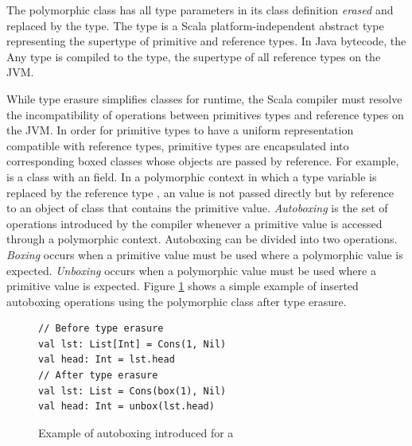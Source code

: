 The polymorphic  class has all type parameters in its class definition \textit{erased} and replaced by the  type.
The  type is a Scala platform-independent\cite{scala:overview} abstract type representing the supertype of primitive and reference types.
In Java bytecode, the {Any} type is compiled to the  type, the supertype of all reference types on the JVM.

While type erasure simplifies classes for runtime, the Scala compiler must resolve the incompatibility of operations between primitives types and reference types on the JVM\cite{java:vm-spec}.
In order for primitive types to have a uniform representation compatible with reference types, primitive types are encapsulated into corresponding boxed classes whose objects are passed by reference.
For example,  is a class with an  field.
In a polymorphic context in which a type variable is replaced by the reference type , an  value is not passed directly but by reference to an object of class  that contains the primitive value.
\textit{Autoboxing}\cite{java:autoboxing} is the set of operations introduced by the compiler whenever a primitive value is accessed through a polymorphic context. 
Autoboxing can be divided into two operations.
\textit{Boxing} occurs when a primitive value must be used where a polymorphic value is expected.
\textit{Unboxing} occurs when a polymorphic value must be used where a primitive value is expected.
Figure \ref{example:autoboxing} shows a simple example of inserted autoboxing operations using the polymorphic  class after type erasure.

\begin{figure}[!htb]
\begin{verbatim}
// Before type erasure 	
val lst: List[Int] = Cons(1, Nil)
val head: Int = lst.head
// After type erasure
val lst: List = Cons(box(1), Nil)
val head: Int = unbox(lst.head) 
\end{verbatim}
\caption{Example of autoboxing introduced for a }
\label{example:autoboxing}
\end{figure}

